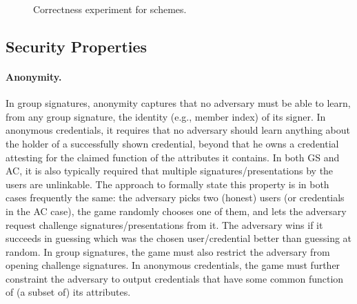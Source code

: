 \begin{figure}[htp!]
  
  \caption{Correctness experiment for \UAS schemes.}
  \label{fig:exp-uas-corr}
\end{figure}

\subsection{Security Properties}
\label{ssec:security}

\paragraph{Anonymity.} %
In group signatures, anonymity captures that no adversary must be able to learn,
from any group signature, the identity (e.g., member index) of its signer. In 
anonymous credentials, it requires that no adversary should learn anything about
the holder of a successfully shown credential, beyond that he owns a credential
attesting for the claimed function of the attributes it contains. In both GS and
AC, it is also typically required that
multiple signatures/presentations by the users are unlinkable. The approach to
formally state this property is in both cases frequently the same: the adversary
picks two (honest) users (or credentials in the AC case), the game randomly
chooses one of them, and lets the adversary request challenge
signatures/presentations from it. The adversary wins if it succeeds in guessing
which was the chosen user/credential better than guessing at random. In group
signatures, the game must also restrict the adversary from opening challenge
signatures. In anonymous credentials, the game must further constraint the
adversary to output credentials that have some common function of (a subset of)
its attributes.

